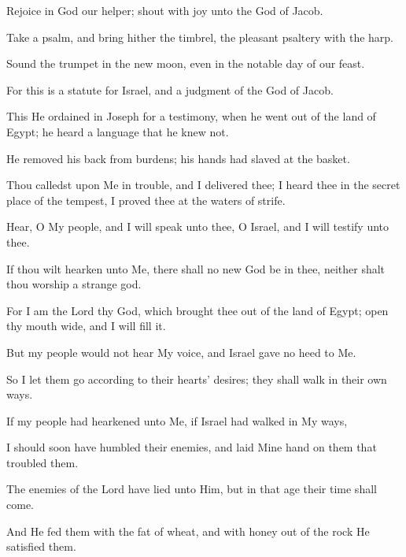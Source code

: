 Rejoice in God our helper; shout with joy unto the God of Jacob.

Take a psalm, and bring hither the timbrel, the pleasant psaltery with the harp.

Sound the trumpet in the new moon, even in the notable day of our feast.

For this is a statute for Israel, and a judgment of the God of Jacob.

This He ordained in Joseph for a testimony, when he went out of the land of Egypt; he heard a language that he knew not.

He removed his back from burdens; his hands had slaved at the basket.

Thou calledst upon Me in trouble, and I delivered thee; I heard thee in the secret place of the tempest, I proved thee at the waters of strife.

Hear, O My people, and I will speak unto thee, O Israel, and I will testify unto thee.

If thou wilt hearken unto Me, there shall no new God be in thee, neither shalt thou worship a strange god.

For I am the Lord thy God, which brought thee out of the land of Egypt; open thy mouth wide, and I will fill it.

But my people would not hear My voice, and Israel gave no heed to Me.

So I let them go according to their hearts' desires; they shall walk in their own ways.

If my people had hearkened unto Me, if Israel had walked in My ways,

I should soon have humbled their enemies, and laid Mine hand on them that troubled them.

The enemies of the Lord have lied unto Him, but in that age their time shall come.

And He fed them with the fat of wheat, and with honey out of the rock He satisfied them.
